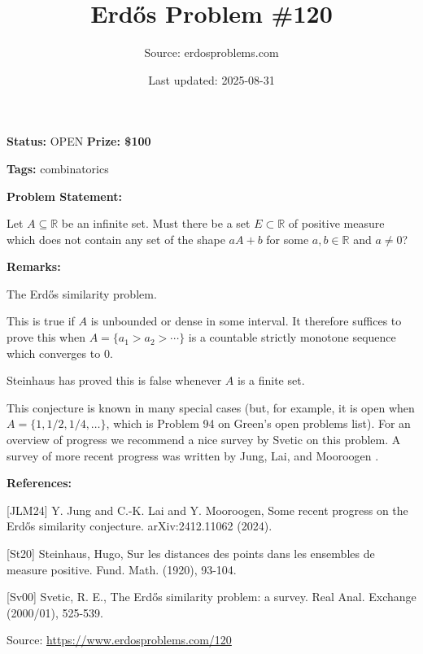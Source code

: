 \documentclass{article}
\title{Erd\H{o}s Problem \#120}
\date{Last updated: 2025-08-31}
\author{Source: erdosproblems.com}
\begin{document}
\maketitle

\noindent\textbf{Status:} OPEN \quad \textbf{Prize: \$100}

\noindent\textbf{Tags:} combinatorics

\medskip
\noindent\textbf{Problem Statement:}

Let $A\subseteq\mathbb{R}$ be an infinite set. Must there be a set $E\subset \mathbb{R}$ of positive measure which does not contain any set of the shape $aA+b$ for some $a,b\in\mathbb{R}$ and $a\neq 0$?

\bigskip
\noindent\textbf{Remarks:}

The Erd\H{o}s similarity problem. 

This is true if $A$ is unbounded or dense in some interval. It therefore suffices to prove this when $A=\{a_1>a_2>\cdots\}$ is a countable strictly monotone sequence which converges to $0$. 

Steinhaus \cite{St20} has proved this is false whenever $A$ is a finite set. 

This conjecture is known in many special cases (but, for example, it is open when $A=\{1,1/2,1/4,\ldots\}$, which is Problem 94 on Green's open problems list). For an overview of progress we recommend a nice survey by Svetic \cite{Sv00} on this problem. A survey of more recent progress was written by Jung, Lai, and Mooroogen \cite{JLM24}.

\bigskip
\noindent\textbf{References:}

[JLM24] Y. Jung and C.-K. Lai and Y. Mooroogen, Some recent progress on the Erd\H{o}s similarity conjecture. arXiv:2412.11062 (2024).
 
 [St20] Steinhaus, Hugo, Sur les distances des points dans les ensembles de measure positive. Fund. Math. (1920), 93-104.
 
 [Sv00] Svetic, R. E., The Erd\H{o}s similarity problem: a survey. Real Anal. Exchange (2000/01), 525-539.

\bigskip
\noindent\small{Source: \url{https://www.erdosproblems.com/120}}
\end{document}
